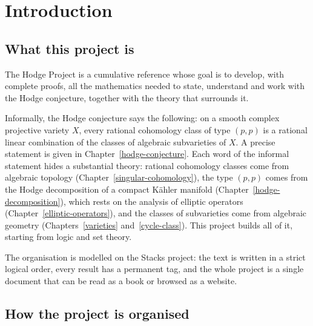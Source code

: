 \chapter{Introduction}\label{introduction}

\section{What this project is}\label{introduction:section-aim}

The Hodge Project is a cumulative reference whose goal is to develop, with
complete proofs, all the mathematics needed to state, understand and work with
the Hodge conjecture, together with the theory that surrounds it.

Informally, the Hodge conjecture says the following: on a smooth complex
projective variety $X$, every rational cohomology class of type $(p,p)$ is a
rational linear combination of the classes of algebraic subvarieties of $X$. A
precise statement is given in Chapter~\ref{hodge-conjecture}. Each word of the
informal statement hides a substantial theory: rational cohomology classes
come from algebraic topology (Chapter~\ref{singular-cohomology}), the type
$(p,p)$ comes from the Hodge decomposition of a compact K\"ahler manifold
(Chapter~\ref{hodge-decomposition}), which rests on the analysis of elliptic
operators (Chapter~\ref{elliptic-operators}), and the classes of subvarieties
come from algebraic geometry (Chapters~\ref{varieties} and~\ref{cycle-class}).
This project builds all of it, starting from logic and set theory.

The organisation is modelled on the Stacks project: the text is written in a
strict logical order, every result has a permanent tag, and the whole project
is a single document that can be read as a book or browsed as a website.

\section{How the project is organised}\label{introduction:section-organisation}

